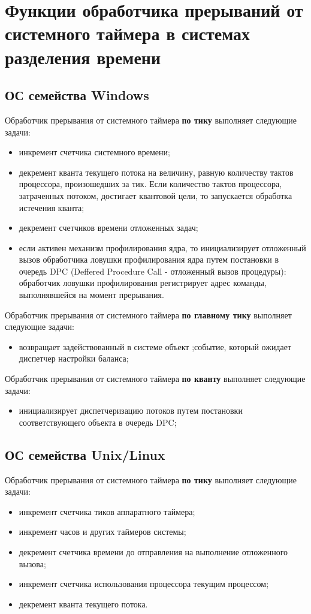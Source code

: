\chapter{Функции обработчика прерываний от системного таймера в системах разделения времени}
\section{ОС семейства Windows}
Обработчик прерывания от системного таймера \textbf{по тику} выполняет следующие задачи:
\begin{itemize}
	\item инкремент счетчика системного времени;
	\item декремент кванта текущего потока на величину, равную количеству тактов процессора, произошедших за тик. Если количество тактов процессора, затраченных потоком, достигает квантовой цели, то запускается обработка истечения кванта;
	\item декремент счетчиков времени отложенных задач;
	\item если активен механизм профилирования ядра, то инициализирует отложенный вызов обработчика ловушки профилирования ядра путем постановки в очередь DPC (Deffered Procedure Call - отложенный вызов процедуры): обработчик ловушки профилирования регистрирует адрес команды, выполнявшейся на момент прерывания.
\end{itemize}

Обработчик прерывания от системного таймера \textbf{по главному тику} выполняет следующие задачи:
\begin{itemize}
	\item возвращает задействованный в системе объект \grqq;событие\grqq, который ожидает диспетчер настройки баланса;
\end{itemize}

Обработчик прерывания от системного таймера \textbf{по кванту} выполняет следующие задачи:
\begin{itemize}
	\item инициализирует диспетчеризацию потоков путем постановки соответствующего объекта в очередь DPC;
\end{itemize}

\section{ОС семейства Unix/Linux}
Обработчик прерывания от системного таймера \textbf{по тику} выполняет следующие задачи:
\begin{itemize}
	\item инкремент счетчика тиков аппаратного таймера;
	\item инкремент часов и других таймеров системы;
	\item декремент счетчика времени до отправления на выполнение отложенного вызова;
	\item инкремент счетчика использования процессора текущим процессом;
	\item декремент кванта текущего потока.
\end{itemize}

